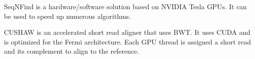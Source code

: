 \documentclass[../main/thesis.tex]{subfiles}
\begin{document}
SeqNFind \cite{SeqNFind} is a hardware/software solution based on NVIDIA Tesla GPUs.
It can be used to speed up numerous algorithms.


CUSHAW \cite{cushaw} is an accelerated short read aligner that uses BWT.
It uses CUDA and is optimized for the Fermi architecture.
Each GPU thread is assigned a short read and its complement to align to the reference.

\end{document}
